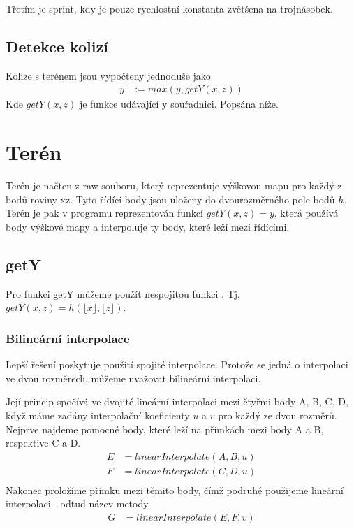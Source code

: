 \documentclass{zcu_sp}
\begin{document}
Třetím je sprint, kdy je pouze rychlostní konstanta zvětšena na trojnásobek.

\subsection{Detekce kolizí}
Kolize s terénem jsou vypočteny jednoduše jako 
\begin{align*}
y &:= max(y, getY(x, z))
\end{align*}
Kde $getY(x, z)$ je funkce udávající y souřadnici. Popsána níže.


\section{Terén}
Terén je načten z raw souboru, který reprezentuje výškovou mapu pro každý z
bodů roviny xz. Tyto řídící body jsou uloženy do dvourozměrného pole bodů $h$.
Terén je pak v programu reprezentován funkcí $getY(x, z) = y$, která používá
body výškové mapy a interpoluje ty body, které leží mezi řídícími.

\subsection{getY}
Pro funkci getY můžeme použít nespojitou funkci . Tj. $getY(x, z) =
h (\lfloor x \rfloor, \lfloor z \rfloor)$.

\subsubsection{Bilineární interpolace}
Lepší řešení poskytuje použití spojité interpolace. Protože se jedná o
interpolaci ve dvou rozměrech, můžeme uvažovat bilineární interpolaci.

Její princip spočívá ve dvojité lineární interpolaci mezi čtyřmi body A, B, C,
D, když máme zadány interpolační koeficienty $u$ a $v$ pro každý ze dvou
rozměrů. Nejprve najdeme pomocné body, které leží na přímkách mezi body A a B,
respektive C a D.
\begin{align*}
E &= linearInterpolate(A, B, u) \\
F &= linearInterpolate(C, D, u) \\
\end{align*}
Nakonec proložíme přímku mezi těmito body, čímž podruhé použijeme lineární interpolaci - odtud název metody.
\begin{align*}
G &= linearInterpolate(E, F, v) \\
\end{align*}
\end{document}
